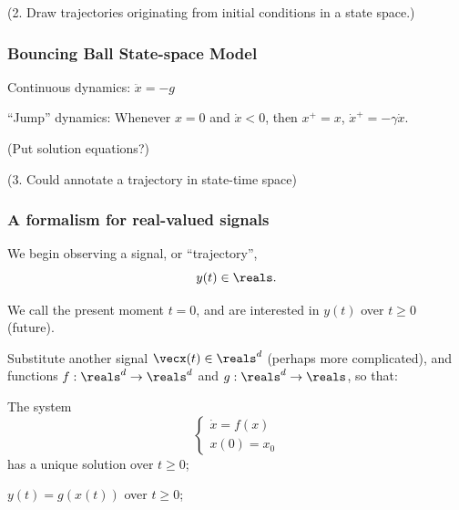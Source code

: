 \documentclass[12pt]{beamer}
\begin{document}
\begin{frame}

(2. Draw trajectories originating from initial conditions in a state space.)

\end{frame}





\begin{frame}
\frametitle{Bouncing Ball State-space Model}

Continuous dynamics: $\ddot x = -g$

``Jump'' dynamics: Whenever $x = 0$ and $\dot x < 0$, then
$x^+ = x$, $\dot x^+ = -\gamma \dot x$.

\end{frame}









\begin{frame}

(Put solution equations?)

(3. Could annotate a trajectory in state-time space)

\end{frame}









\begin{frame}
\frametitle{A formalism for real-valued signals}

\begin{itemize}
\vitem We begin observing a signal, or ``trajectory'',
\[
y(t) \in \reals.
\]

\vitem We call the present moment $t=0$, and are interested in $y(t)$ over $t \geq 0$ (future).


\vitem Substitute another signal $\vecx(t) \in \reals^d$ (perhaps more complicated), and functions $f : \reals^d \to \reals^d$ and $g : \reals^d \to \reals$, so that:

\begin{enumerate}
\vitem The system
\[
\begin{cases}
	\dot x = f(x) \\
	x(0) = x_0
\end{cases}
\]
has a unique solution over $t \geq 0$;

\vitem $y(t) = g( x(t) )$ over $t \geq 0$;


\end{enumerate}

\end{itemize}

\vfill\null
\end{frame}
\end{document}
